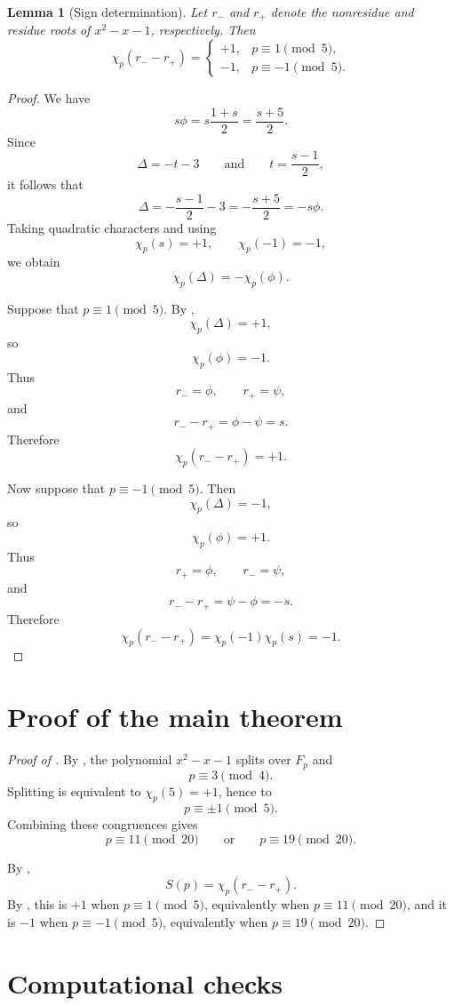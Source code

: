 \documentclass[preprint,12pt]{elsarticle}
\def\F{F}%
\numberwithin{equation}{section}
\theoremstyle{plain}
\newtheorem{lemma}[theorem]{Lemma}
\theoremstyle{definition}
\newcommand{\F}{\mathbb{F}}
\begin{document}
\begin{lemma}[Sign determination]
\label{lem:sign-determination}
Let $r_-$ and $r_+$ denote the nonresidue and residue roots of
$x^2-x-1$, respectively. Then
\[
\chi_p(r_--r_+)=
\begin{cases}
+1,&p\equiv1\pmod5,\\
-1,&p\equiv-1\pmod5.
\end{cases}
\]
\end{lemma}
 
\begin{proof}
We have
\[
s\phi
=
s\frac{1+s}{2}
=
\frac{s+5}{2}.
\]
Since
\[
\Delta=-t-3
\qquad\text{and}\qquad
t=\frac{s-1}{2},
\]
it follows that
\[
\Delta
=
-\frac{s-1}{2}-3
=
-\frac{s+5}{2}
=
-s\phi.
\]
Taking quadratic characters and using
\[
\chi_p(s)=+1,
\qquad
\chi_p(-1)=-1,
\]
we obtain
\[
\chi_p(\Delta)=-\chi_p(\phi).
\]
 
Suppose that $p\equiv1\pmod5$. By
,
\[
\chi_p(\Delta)=+1,
\]
so
\[
\chi_p(\phi)=-1.
\]
Thus
\[
r_-=\phi,
\qquad
r_+=\psi,
\]
and
\[
r_--r_+=\phi-\psi=s.
\]
Therefore
\[
\chi_p(r_--r_+)=+1.
\]
 
Now suppose that $p\equiv-1\pmod5$. Then
\[
\chi_p(\Delta)=-1,
\]
so
\[
\chi_p(\phi)=+1.
\]
Thus
\[
r_+=\phi,
\qquad
r_-=\psi,
\]
and
\[
r_--r_+=\psi-\phi=-s.
\]
Therefore
\[
\chi_p(r_--r_+)
=
\chi_p(-1)\chi_p(s)
=
-1.
\]
\end{proof}
 
\section{Proof of the main theorem}\label{sec:main-proof}
 
\begin{proof}[Proof of ]
By , the polynomial $x^2-x-1$
splits over $\F_p$ and
\[
p\equiv3\pmod4.
\]
Splitting is equivalent to $\chi_p(5)=+1$, hence to
\[
p\equiv\pm1\pmod5.
\]
Combining these congruences gives
\[
p\equiv11\pmod{20}
\qquad\text{or}\qquad
p\equiv19\pmod{20}.
\]
 
By ,
\[
S(p)=\chi_p(r_--r_+).
\]
By , this is $+1$ when
$p\equiv1\pmod5$, equivalently when $p\equiv11\pmod{20}$, and it is
$-1$ when $p\equiv-1\pmod5$, equivalently when
$p\equiv19\pmod{20}$.
\end{proof}
 
\section{Computational checks}\label{sec:computations}
 
\end{document}
